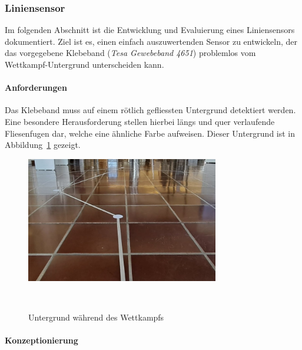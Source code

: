 \documentclass[main.tex]{subfiles} %
\begin{document}

\subsubsection{Liniensensor}

Im folgenden Abschnitt ist die Entwicklung und Evaluierung eines Liniensensors
dokumentiert. Ziel ist es, einen einfach auszuwertenden Sensor zu entwickeln,
der das vorgegebene Klebeband (\textit{Tesa Gewebeband 4651}) problemlos vom Wettkampf-Untergrund unterscheiden kann.

\paragraph{Anforderungen}

Das Klebeband muss auf einem rötlich
gefliessten Untergrund detektiert werden. Eine besondere Herausforderung
stellen hierbei längs und quer verlaufende Fliesenfugen dar, welche eine
ähnliche Farbe aufweisen. Dieser Untergrund ist in
Abbildung~\ref{fig:Untergrund_Wettkampf} gezeigt.

\begin{figure}[H]
    \centering
    \includegraphics[width=0.75\textwidth]{fig_Strecke_Tracken/Bild_Untergrund.jpg}
    \caption{Untergrund während des Wettkampfs}~\label{fig:Untergrund_Wettkampf}
\end{figure}

\paragraph{Konzeptionierung}
\end{document}
